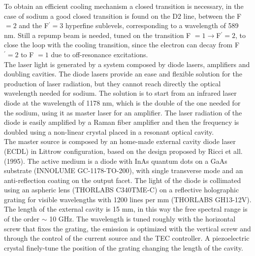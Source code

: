 \documentclass[../thesis.tex]{subfiles}
\begin{document}
To obtain an efficient cooling mechanism a closed transition is necessary, in the case of sodium a good closed transition is found on the D2 line, between the F $=2$ and the F$^\prime =3$ hyperfine sublevels, corresponding to a wavelength of 589 nm. Still a repump beam is needed, tuned on the transition F $=1 \rightarrow $F$^\prime =2$, to close the loop with the cooling transition, since the electron can decay from F$^\prime =2$ to F $=1$ due to off-resonance excitations.\\
The laser light is generated by a system composed by diode lasers, amplifiers and doubling cavities. The diode lasers provide an ease and flexible solution for the production of laser radiation, but they cannot reach directly the optical wavelength needed for sodium. The solution is to start from an infrared laser diode at the wavelength of 1178 nm, which is the double of the one needed for the sodium, using it as master laser for an amplifier. The laser radiation of the diode is easily amplified by a Raman fiber amplifier and then the frequency is doubled using a non-linear crystal placed in a resonant optical cavity.\\

The master source is composed by an home-made external cavity diode laser (ECDL) in Littrow configuration, based on the design proposed by Ricci et all.(1995)\citet{Ricci95}. The active medium is a diode with InAs quantum dots on a GaAs substrate (INNOLUME GC-1178-TO-200), with single transverse mode and an anti-reflection coating on the output facet. The light of the diode is collimated using an aspheric lens (THORLABS C340TME-C) on a reflective holographic grating for visible wavelengths with 1200 lines per mm (THORLABS GH13-12V). The length of the external cavity is 15 mm, in this way the free spectral range is of the order $\sim$ 10 GHz. The wavelength is tuned roughly with the horizontal screw that fixes the grating, the emission is optimized with the vertical screw and through the control of the current source and the TEC controller. A piezoelectric crystal finely-tune the position of the grating changing the length of the cavity.\\
\end{document}
